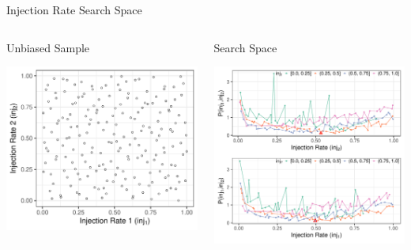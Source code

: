\documentclass[10pt, compress, aspectratio=169, xcolor={table,usenames,dvipsnames}]{beamer}
\begin{document}
\begin{frame}[label={sec:org3382131}]{Injection Rate Search Space}
\begin{columns}
\begin{column}{0.5\columnwidth}
\begin{block}{Unbiased Sample}
\begin{center}
\includegraphics[width=\columnwidth]{../../../img/injection_rates_sobol.pdf}
\end{center}
\end{block}
\end{column}
\begin{column}{0.5\columnwidth}
\begin{block}{Search Space}
\begin{center}
\includegraphics[width=\columnwidth]{../../../img/injection_rates_search_space.pdf}
\end{center}
\end{block}
\end{column}
\end{columns}
\end{frame}
\end{document}
